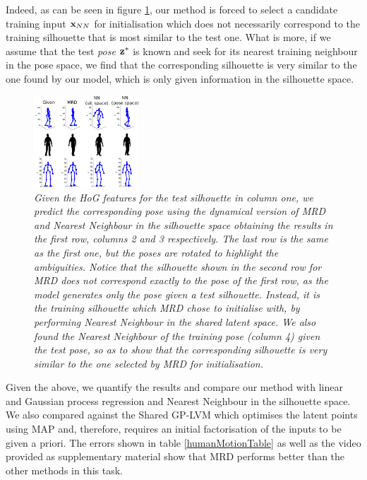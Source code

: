 Indeed, as can be seen in figure \ref{fig:humanPoseAmbiguityTest}, our method is forced to select a candidate training input $\mathbf{x}_{NN}$ for initialisation which does not necessarily
correspond to the training silhouette that is most similar to the test one. 
%
%
What is more, if we assume that the test \emph{pose} $\mathbf{z}^*$ is known and seek for its nearest training neighbour in the pose space, we find that the corresponding silhouette
is very similar to the one found by our model, which is only given information in the silhouette space.

\begin{figure}[ht]
\begin{center}
  \includegraphics[width=0.35\textwidth]{../diagrams/humanPose/ambiguityTest}
\end{center}
\caption{\small{\it Given the HoG features for the test silhouette in column one, we predict the corresponding pose using the dynamical version of MRD and Nearest Neighbour in the silhouette space
obtaining the results in the first row, columns 2 and 3 respectively. The last row is the same as the first one, but the poses are rotated
to highlight the ambiguities. Notice that the silhouette shown in the second row for MRD does not correspond exactly to the pose
of the first row, as the model generates only the pose given a test silhouette. Instead, it is the training silhouette which MRD chose to initialise with, by performing
Nearest Neighbour in the shared latent space. 
We also found the Nearest Neighbour of the training \emph{pose} (column 4) given the test pose, so as to show that the corresponding silhouette is very similar to the one
selected by MRD for initialisation.
}}
\label{fig:humanPoseAmbiguityTest}
\end{figure}

\par Given the above, we quantify the results and compare our method
with linear and Gaussian process regression and Nearest Neighbour in the silhouette space. We also compared against
the Shared GP-LVM \cite{Ek:2008up, Ek:2009vv} which optimises the latent points using MAP and, therefore, requires an initial factorisation
of the inputs to be given a priori. 
The errors shown in table \ref{humanMotionTable} as well as the video provided as supplementary  material show that MRD
performs better than the other methods in this task.



